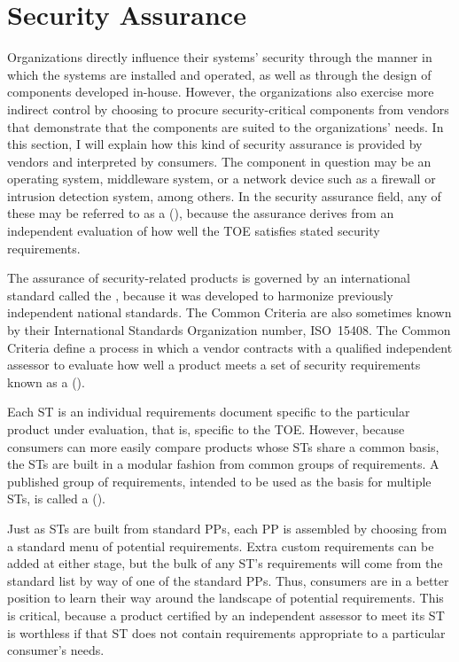 \section{Security Assurance}\label{security-assurance-section}

Organizations directly influence their systems' security through the
manner in which the systems are installed and operated, as well as through
the design of components developed in-house.  However, the
organizations also exercise more indirect control by choosing to
procure security-critical components from vendors that demonstrate
that the components are suited to the organizations' needs.  In this
section, I will explain how this kind of security assurance is
provided by vendors and interpreted by consumers.  The component in
question may be an operating system, middleware system, or a network
device such as a firewall or intrusion detection system, among
others.  In the security assurance field, any of these may be referred
to as a  (), because the
assurance derives from an independent evaluation of how well the TOE
satisfies stated security requirements.

The assurance of security-related products is governed by an
international standard called the , because it
was developed to harmonize previously independent national standards.
The Common Criteria are also sometimes known by their International
Standards Organization number, ISO~15408.  The Common Criteria define
a process in which a vendor contracts with a qualified independent
assessor to evaluate how well a product meets a set of security
requirements known as a  ().

Each ST is an individual requirements document specific to the
particular product under evaluation, that is, specific to the TOE.  However,
because consumers can more easily  compare products whose STs
share a common basis, the STs are built in a modular fashion from
common groups of requirements.  A published group of requirements,
intended to be used as the basis for multiple STs, is called a
 ().

Just as STs are built from standard PPs, each PP is assembled by
choosing from a standard menu of potential requirements.  Extra custom
requirements can be added at either stage, but the bulk of any ST's
requirements will come from the standard list by way of one of the
standard PPs.  Thus, consumers are in a better position to learn their
way around the landscape of potential requirements.  This is critical,
because a product certified by an independent assessor to meet its ST
is worthless if that ST does not contain requirements appropriate to a
particular consumer's needs.

